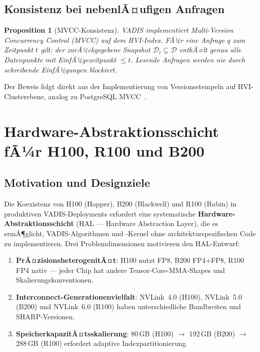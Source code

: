 ﻿\documentclass[12pt,a4paper]{article}
\newtheorem{proposition}[theorem]{Proposition}
\begin{document}
\subsection{Konsistenz bei nebenlÃ¤ufigen Anfragen}

\begin{proposition}[MVCC-Konsistenz]
\label{prop:mvcc}
VADIS implementiert \emph{Multi-Version Concurrency Control} (MVCC)
auf dem HVI-Index. FÃ¼r eine Anfrage $q$ zum Zeitpunkt $t$ gilt:
der zurÃ¼ckgegebene Snapshot $\mathcal{D}_t \subseteq \mathcal{D}$
enthÃ¤lt genau alle Datenpunkte mit EinfÃ¼gezeitpunkt $\leq t$.
Lesende Anfragen werden nie durch schreibende EinfÃ¼gungen blockiert.
\end{proposition}

Der Beweis folgt direkt aus der Implementierung von Versionsstempeln
auf HVI-Clusterebene, analog zu PostgreSQL MVCC~\cite{momjian2001postgresql}.

\section{Hardware-Abstraktionsschicht fÃ¼r H100, R100 und B200}
\label{sec:hwabs_nvidia}

\subsection{Motivation und Designziele}
\label{sub:hwabs_motivation}

Die Koexistenz von H100 (Hopper), B200 (Blackwell) und R100 (Rubin)
in produktiven VADIS-Deployments erfordert eine systematische
\textbf{Hardware-Abstraktionsschicht} (HAL --- Hardware
Abstraction Layer), die es ermÃ¶glicht, VADIS-Algorithmen
und -Kernel ohne architekturspezifischen Code zu implementieren.
Drei Problemdimensionen motivieren den HAL-Entwurf:

\begin{enumerate}[leftmargin=1.4em, itemsep=2pt, topsep=4pt]
  \item \textbf{PrÃ¤zisionsheterogenitÃ¤t}: H100 nutzt FP8, B200
        FP4+FP8, R100 FP4 nativ --- jeder Chip hat andere
        Tensor-Core-MMA-Shapes und Skalierungskonventionen.
  \item \textbf{Interconnect-Generationenvielfalt}: NVLink~4.0
        (H100), NVLink~5.0 (B200) und NVLink~6.0 (R100) haben
        unterschiedliche Bandbreiten und SHARP-Versionen.
  \item \textbf{SpeicherkapazitÃ¤tsskalierung}: 80\,GB (H100) $\to$
        192\,GB (B200) $\to$ 288\,GB (R100) erfordert adaptive
        Indexpartitionierung.
\end{enumerate}
\end{document}
